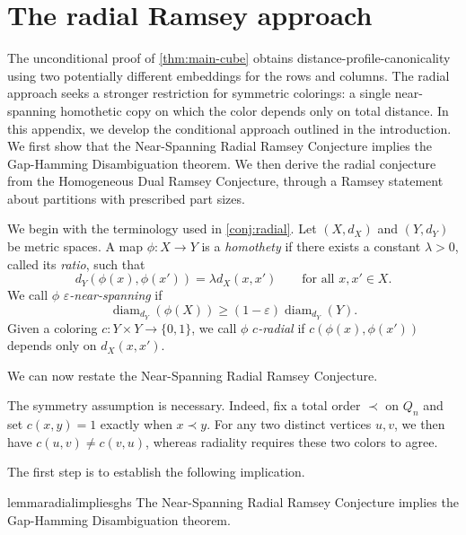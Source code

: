 \documentclass[11pt]{article}
\DeclareMathOperator{\diam}{diam}
\theoremstyle{remark}
\begin{document}



\appendix

\section{The radial Ramsey approach}\label{sec:hdr}

The unconditional proof of \cref{thm:main-cube} obtains distance-profile-canonicality using two potentially different embeddings for the rows and columns.
The radial approach seeks a stronger restriction for symmetric colorings: a single near-spanning homothetic copy on which the color depends only on total distance.
In this appendix, we develop the conditional approach outlined in the introduction.
We first show that the Near-Spanning Radial Ramsey Conjecture implies the Gap-Hamming Disambiguation theorem.
We then derive the radial conjecture from the Homogeneous Dual Ramsey Conjecture, through a Ramsey statement about partitions with prescribed part sizes.

We begin with the terminology used in \cref{conj:radial}.
Let $(X,d_X)$ and $(Y,d_Y)$ be metric spaces.
A map $\phi:X\to Y$ is a \emph{homothety} if there exists a constant $\lambda>0$, called its \emph{ratio}, such that
\[
    d_Y(\phi(x),\phi(x'))=\lambda d_X(x,x')
    \qquad\text{for all }x,x'\in X.
\]
We call $\phi$ \emph{$\varepsilon$-near-spanning} if
\[
    \diam_{d_Y}(\phi(X))
    \geq (1-\varepsilon)\diam_{d_Y}(Y).
\]
Given a coloring $c:Y\times Y\to\{0,1\}$, we call $\phi$
\emph{$c$-radial} if $c(\phi(x),\phi(x'))$ depends only on
$d_X(x,x')$.

We can now restate the Near-Spanning Radial Ramsey Conjecture.

\nearspanningradialramsey*

The symmetry assumption is necessary.
Indeed, fix a total order $\prec$ on $Q_n$ and set $c(x,y)=1$
exactly when $x\prec y$.
For any two distinct vertices $u,v$, we then have
$c(u,v)\neq c(v,u)$, whereas radiality requires these two
colors to agree.

The first step is to establish the following implication.

\begin{restatable}{lemma}{radialimpliesghs}\label{lem:radial-implies-ghs}
    The Near-Spanning Radial Ramsey Conjecture implies the
    Gap-Hamming Disambiguation theorem.
\end{restatable}
\end{document}
